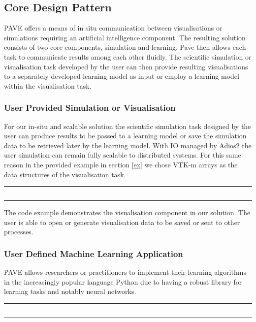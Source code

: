 \documentclass[conference]{IEEEtran}
\begin{document}



\subsection{Core Design Pattern}
 
PAVE offers a means of in situ communication between visualisations or simulations requiring an artificial intelligence component. The resulting solution consists of two core components, simulation and learning. Pave then allows each task to communicate results among each other fluidly. The scientific simulation or visualisation task developed by the user can then provide resulting visualisations to a separately developed learning model as input or employ a learning model within the visualisation task.  

\subsubsection{User Provided Simulation or Visualisation}

For our in-situ and scalable solution the scientific simulation task designed by the user can produce results to be passed to a learning model or save the simulation data to be retrieved later by the learning model. With IO managed by Adios2 the user simulation can remain fully scalable to distributed systems. For this same reason in the provided example in section \ref{ex} we chose VTK-m arrays as the data structures of the visualisation task.
\noindent\rule{0.5\textwidth}{1pt}
\inputminted{cpp}{pave_pt.py}\label{PAVEvis}
\noindent\rule{0.5\textwidth}{1pt}

The code example  demonstrates the visualisation component in our solution. The user is able to open or generate visualisation data to be saved or sent to other processes. 

\subsubsection{User Defined Machine Learning Application}

PAVE allows researchers or practitioners to implement their learning algorithms in the increasingly popular language Python due to having a robust library for learning tasks and notably neural networks. 

\noindent\rule{0.5\textwidth}{1pt}\label{PAVElearn}
\inputminted{python}{pave.py}
\noindent\rule{0.5\textwidth}{1pt}
\end{document}
